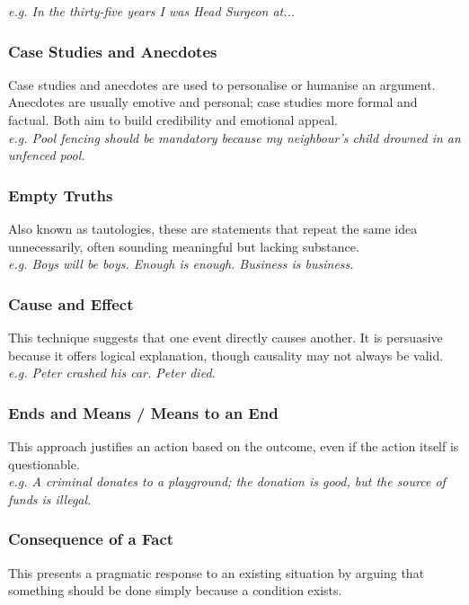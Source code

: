 \documentclass[a4paper]{article}
\begin{document}
\textit{e.g. In the thirty-five years I was Head Surgeon at...}\\

\subsubsection{Case Studies and Anecdotes}
Case studies and anecdotes are used to personalise or humanise an argument. Anecdotes are usually emotive and personal; case studies more formal and factual. Both aim to build credibility and emotional appeal.\\

\textit{e.g. Pool fencing should be mandatory because my neighbour’s child drowned in an unfenced pool.}\\

\subsubsection{Empty Truths}
Also known as tautologies, these are statements that repeat the same idea unnecessarily, often sounding meaningful but lacking substance.\\

\textit{e.g. Boys will be boys. Enough is enough. Business is business.}\\

\subsubsection{Cause and Effect}
This technique suggests that one event directly causes another. It is persuasive because it offers logical explanation, though causality may not always be valid.\\

\textit{e.g. Peter crashed his car. Peter died.}\\

\subsubsection{Ends and Means / Means to an End}
This approach justifies an action based on the outcome, even if the action itself is questionable.\\
\textit{e.g. A criminal donates to a playground; the donation is good, but the source of funds is illegal.}\\

\subsubsection{Consequence of a Fact}
This presents a pragmatic response to an existing situation by arguing that something should be done simply because a condition exists.\\
\end{document}

